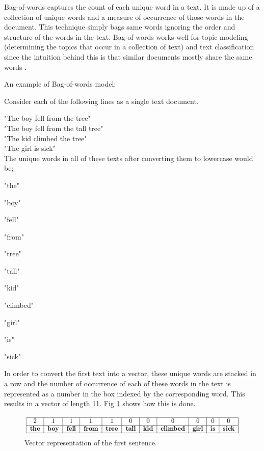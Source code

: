 	Bag-of-words captures the count of each unique word in a text. It is made up of a collection of unique words and a measure of occurrence of those words in the document. This technique simply bags same words ignoring the order and structure of the words in the text. Bag-of-words works well for topic modeling (determining the topics that occur in a collection of text) and text classification since the intuition behind this is that similar documents mostly share the same words \cite{bow_model}.   
	
	An example of Bag-of-words model:
	
	Consider each of the following lines as a single text document.
	
	"The boy fell from the tree" \\
	
	"The boy fell from the tall tree" \\
	
	"The kid climbed the tree" \\
	
	"The girl is sick" \\
	
	The unique words in all of these texts after converting them to lowercase would be;
	
	"the" 
	
	"boy"
	
	"fell"
	
	"from"
	
	"tree"
	
	"tall"
	
	"kid"
	
	"climbed" 
	
	"girl"
	
	"is"
	
	"sick"
	
	In order to convert the first text into a vector, these unique words are stacked in a row and the number of occurrence of each of these words in the text is represented as a number in the box indexed by the corresponding word. This results in a vector of length 11. Fig \ref{bowex1} shows how this is done. 
	
	\begin{figure}[h!]
		\centering
		\includegraphics[scale=0.5]{images/bowex1}
		\caption{Vector representation of the first sentence.}
		\label{bowex1}
	\end{figure}
	
